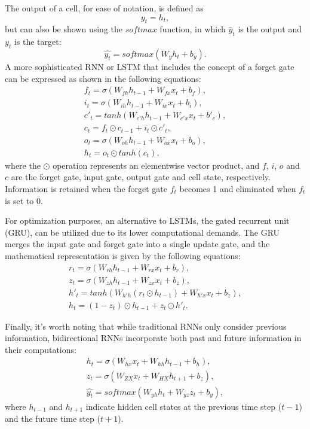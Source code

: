 \documentclass[fleqn,10pt]{wlscirep}
\begin{document}
The output of a cell, for ease of notation, is defined as 
\begin{equation}
y_t=h_t,
\end{equation}
but can also be shown using the $softmax$ function, in which $\hat{y}_t$ is the output and $y_t$ is the target:
\begin{equation}
\hat{y_t}=softmax(W_y h_t+b_y).
\end{equation}
A more sophisticated RNN or LSTM that includes the concept of a forget gate can be expressed as shown in the following equations:
\begin{gather}
f_t=\sigma(W_{fh} h_{t-1}+W_{fx} x_t+b_f),\\
i_t=\sigma(W_{ih} h_{t-1}+W_{ix} x_t+b_i),\\
c'_t=tanh(W_{c'h} h_{t-1}+W_{c'x} x_t+b'_c),\\
c_t=f_t \odot c_{t-1}+i_t \odot c'_t,\\
o_t=\sigma(W_{oh} h_{t-1}+W_{ox} x_t+b_o),\\
h_t=o_t \odot tanh(c_t),
\end{gather}
where the $\odot$ operation represents an elementwise vector product, and $f$, $i$, $o$ and $c$ are the forget gate, input gate, output gate and cell state, respectively. Information is retained when the forget gate $f_t$ becomes 1 and eliminated when $f_t$ is set to 0.

For optimization purposes, an alternative to LSTMs, the gated recurrent unit (GRU), can be utilized due to its lower computational demands. The GRU merges the input gate and forget gate into a single update gate, and the mathematical representation is given by the following equations:
\begin{gather}
r_t=\sigma(W_{rh} h_{t-1}+W_{rx} x_t+b_r),
\\
z_t=\sigma(W_{zh} h_{t-1}+W_{zx} x_t+b_z),
\\
h'_t=tanh(W_{h'h} (r_t \odot h_{t-1})+W_{h'x} x_t+b_z),
\\
h_t=(1-z_t) \odot h_{t-1}+z_t \odot h'_t.
\end{gather}

Finally, it's worth noting that while traditional RNNs only consider previous information, bidirectional RNNs incorporate both past and future information in their computations:
\begin{gather}
h_t=\sigma(W_{hx} x_t+W_{hh} h_{t-1} +b_h),
\\
z_t=\sigma(W_{ZX} x_t+W_{HX} h_{t+1} +b_z),
\\
\hat{y_t}=softmax(W_{yh} h_t+W_{yz} z_t+b_y),
\end{gather}
where $h_{t-1}$ and $h_{t+1}$ indicate hidden cell states at the previous time step ($t-1$) and the future time step ($t+1$).
\end{document}

